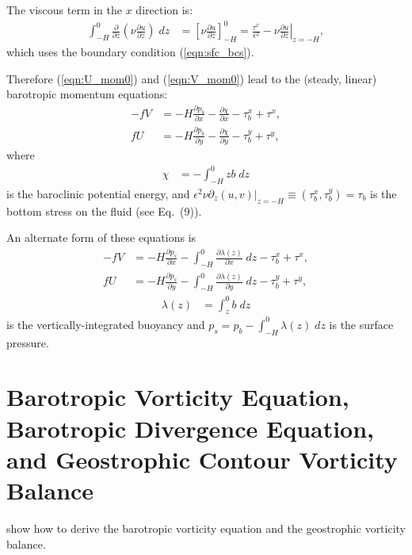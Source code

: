 \documentclass[10pt]{amsart}
\begin{document}
 The viscous term in the $x$ direction is:
 \begin{align}
  \int_{-H}^{0} \frac{\partial}{\partial z} \left( \nu \frac{\partial u}{\partial z} \right) \; dz & = \left[  \nu \frac{\partial u}{\partial z}  \right]_{-H}^{0}  = \frac{\tau^x}{ \epsilon^2}  - \left. \nu \frac{\partial u}{\partial z} \right|_{z = -H} ,
 \end{align}
which uses the boundary condition (\ref{eqn:sfc_bcs}).
  
 Therefore (\ref{eqn:U_mom0}) and (\ref{eqn:V_mom0}) lead to the (steady, linear) barotropic momentum equations:
 \begin{align}
- f V & =  - H \frac{\partial p_b}{\partial x} - \frac{\partial \chi}{\partial x}  - \tau^x_b + \tau^x , \label{eqn:U_mom} \\
f  U & = - H \frac{\partial p_b}{\partial y} - \frac{\partial \chi }{\partial y}  - \tau^y_b + \tau^y \label{eqn:V_mom} ,
\end{align}
where
\begin{align}
\chi & = - \int_{-H}^0 z b \; dz
\label{eqn:baroclinic_PE}
\end{align}
is the baroclinic potential energy, and $\epsilon^2  \nu \left. \partial_z (u,v) \right|_{z = -H}  \equiv (\tau^x_b, \tau^y_b) = \tau_b$ is the bottom stress on the fluid (see \citealt{waldman&giordani23} Eq.~(9)).

An alternate form of these equations is
 \begin{align}
- f V & =  - H \frac{\partial p_s}{\partial x} - \int_{-H}^0 \frac{\partial  \lambda(z)}{\partial x} \; dz - \tau^x_b + \tau^x , \label{eqn:U_mom_alt} \\
f  U & = - H \frac{\partial p_s}{\partial y} -  \int_{-H}^0 \frac{\partial \lambda(z) }{\partial y}  \; dz - \tau^y_b + \tau^y \label{eqn:V_mom_alt} ,
\end{align}
\begin{align}
\lambda (z) & = \int_{z}^0 b \; dz
\label{eqn:buoyancy_int}
\end{align}
is the vertically-integrated buoyancy and $p_s = p_b - \int_{-H}^0 \lambda(z) \; dz$ is the surface pressure.


\section{Barotropic Vorticity Equation, Barotropic Divergence Equation, and Geostrophic Contour Vorticity Balance}
\citet{waldman&giordani23} show how to derive the barotropic vorticity equation and the geostrophic vorticity balance.
\end{document}
